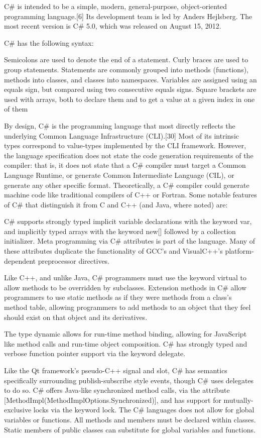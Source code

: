 \vpara
C\# is intended to be a simple, modern, general-purpose, object-oriented programming language.[6] Its development team is led by Anders Hejlsberg. The most recent version is C\# 5.0, which was released on August 15, 2012.

C\# has the following syntax:

Semicolons are used to denote the end of a statement.
Curly braces are used to group statements. Statements are commonly grouped into methods (functions), methods into classes, and classes into namespaces.
Variables are assigned using an equals sign, but compared using two consecutive equals signs.
Square brackets are used with arrays, both to declare them and to get a value at a given index in one of them

\vpara
By design, C\# is the programming language that most directly reflects the underlying Common Language Infrastructure (CLI).[30] Most of its intrinsic types correspond to value-types implemented by the CLI framework. However, the language specification does not state the code generation requirements of the compiler: that is, it does not state that a C\# compiler must target a Common Language Runtime, or generate Common Intermediate Language (CIL), or generate any other specific format. Theoretically, a C\# compiler could generate machine code like traditional compilers of C++ or Fortran. Some notable features of C\# that distinguish it from C and C++ (and Java, where noted) are:

\vpara
C\# supports strongly typed implicit variable declarations with the keyword var, and implicitly typed arrays with the keyword new[] followed by a collection initializer.
Meta programming via C\# attributes is part of the language. Many of these attributes duplicate the functionality of GCC's and VisualC++'s platform-dependent preprocessor directives.

\vpara
Like C++, and unlike Java, C\# programmers must use the keyword virtual to allow methods to be overridden by subclasses.
Extension methods in C\# allow programmers to use static methods as if they were methods from a class's method table, allowing programmers to add methods to an object that they feel should exist on that object and its derivatives.

\vpara
The type dynamic allows for run-time method binding, allowing for JavaScript like method calls and run-time object composition.
C\# has strongly typed and verbose function pointer support via the keyword delegate.

\vpara
Like the Qt framework's pseudo-C++ signal and slot, C\# has semantics specifically surrounding publish-subscribe style events, though C\# uses delegates to do so.
C\# offers Java-like synchronized method calls, via the attribute [MethodImpl(MethodImplOptions.Synchronized)], and has support for mutually-exclusive locks via the keyword lock.
The C\# languages does not allow for global variables or functions. All methods and members must be declared within classes. Static members of public classes can substitute for global variables and functions.

